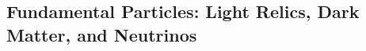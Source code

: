 \documentclass[PICOAPC.tex]{subfiles}
\begin{document}



\subsection{Fundamental Particles: Light Relics, Dark Matter, and Neutrinos}
\label{sec:relics_neutrinos}
\end{document}
